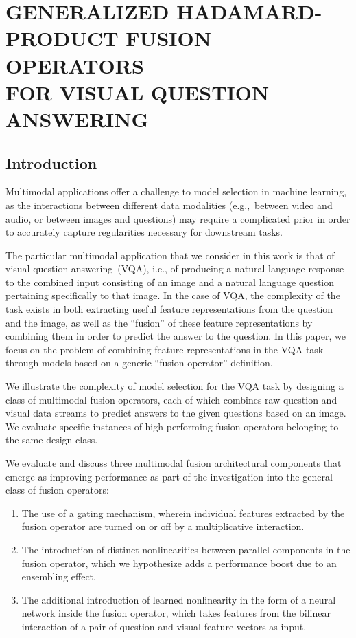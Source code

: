 \chapter{GENERALIZED HADAMARD-PRODUCT FUSION OPERATORS \\
         FOR VISUAL QUESTION ANSWERING}


\section{Introduction}

Multimodal applications offer a challenge to model selection in machine
learning, as the interactions between different data modalities (e.g.,~between
video and audio, or between images and questions) may require a complicated
prior in order to accurately capture regularities necessary for downstream tasks.

The particular multimodal application that we consider in this work is that of
visual question-answering~(VQA), i.e., of producing a natural language response
to the combined input consisting of an image and a natural language question
pertaining specifically to that image. In the case of VQA, the complexity of
the task exists in both extracting useful feature representations from the
question and the image, as well as the ``fusion'' of these feature
representations by combining them in order to predict the answer to the
question. In this paper, we focus on the problem of combining feature
representations in the VQA task through models based on a generic ``fusion
operator'' definition.

We illustrate the complexity of model selection for the VQA task by designing a
class of multimodal fusion operators, each of which combines raw question and
visual data streams to predict answers to the given questions based on an
image. We evaluate specific instances of high performing fusion operators
belonging to the same design class.

We evaluate and discuss three multimodal fusion architectural components that
emerge as improving performance as part of the investigation into the general
class of fusion operators:

\begin{enumerate}
        \item The use of a gating mechanism, wherein individual features
                extracted by the fusion operator are turned on or off by a
                multiplicative interaction.

        \item The introduction of distinct nonlinearities between parallel
                components in the fusion operator, which we hypothesize adds a
                performance boost due to an ensembling effect.

        \item The additional introduction of learned nonlinearity in the form
                of a neural network inside the fusion operator, which takes
                features from the bilinear interaction of a pair of question
                and visual feature vectors as input.
\end{enumerate}


